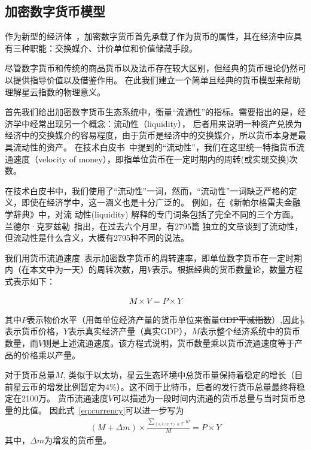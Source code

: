 \subsection{加密数字货币模型}

作为新型的经济体~\cite{swan2015blockchain}，加密数字货币首先承载了作为货币的属性，{\color{blue}其在经济中应具有三种职能：交换媒介、计价单位和价值储藏手段。}

尽管数字货币和传统的商品货币以及法币存在较大区别，但经典的货币理论仍然可以提供指导价值以及借鉴作用。
在此我们建立一个简单且经典的货币模型来帮助理解星云指数的物理意义。

首先我们给出加密数字货币生态系统中，衡量“流通性”的指标。需要指出的是，经济学中经常出现另一个概念：流动性（liquidity），
后者用来说明一种资产兑换为经济中的交换媒介的容易程度，由于货币是经济中的交换媒介，所以货币本身是最具流动性的资产。
在技术白皮书~\cite{Nabulas}中提到的“流动性”，我们在这里统一特指货币流通速度（velocity of money），即指单位货币在一定时期内的周转(或实现交换)次数。

{\color{gray} 在技术白皮书中，我们使用了``流动性''一词，然而，``流动性''一词缺乏严格的定义，即使在经济学中，这一涵义也是十分广泛的。
例如，在《新帕尔格雷夫金融学辞典》中，对流
动性(liquidity) 解释的专门词条包括了完全不同的三个方面。兰德尔·克罗兹勒~\cite{randall}指出，在过去六个月里，有2795篇
独立的文章谈到了流动性，但流动性是什么含义，大概有2795种不同的说法。}


我们用货币流通速度~\cite{selden}表示加密数字货币的周转速率，即单位数字货币在一定时期内（在本文中为一天）的周转次数，用$V$表示。根据经典的货币数量论，数量方程式表示如下：

\begin{align}
M\times V=P\times Y
\label{eq:currency}
\end{align}

其中$P$表示物价水平（用每单位经济产量的货币单位来衡量\sout{GDP平减指数}）,因此$\frac{1}{P}$表示货币价格，$Y$表示真实经济产量（真实GDP），$M$表示整个经济系统中的货币数量，而$V$则是上述流通速度。该方程式说明，货币数量乘以货币流通速度等于产品的价格乘以产量。


对于货币总量$M$, 类似于以太坊，星云生态环境中总货币量保持着稳定的增长（目前星云币的增发比例暂定为4\%）。这不同于比特币，后者的发行货币总量最终将稳定在2100万。
货币流通速度$V$可以描述为一段时间内流通的货币总量与当时货币总量的比值。
因此式~\ref{eq:currency}可以进一步写为
\begin{align}
(M + \Delta{m}) \times \frac{\sum_{(s, t, w, \tau)\in \mathcal{T}}{w}}{M} = P \times Y
\label{eq:cur_ext}
\end{align}
\noindent 其中，$\Delta{m}$为增发的货币量。


